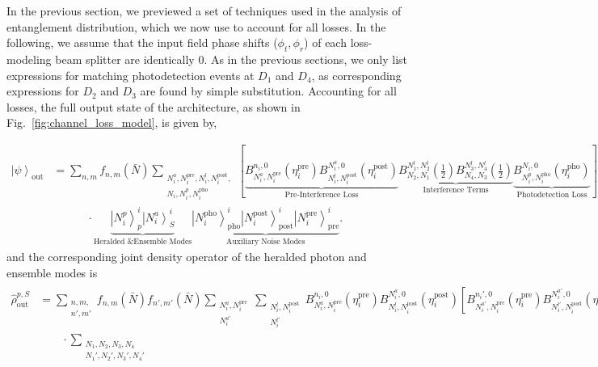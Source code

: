 \documentclass[aps,twocolumn,secnumarabic,amsmath,amssymb,pra,groupedaddress,
showpacs, showkeys,draft]{revtex4-1}
\newcommand{\ket}[1]{\left|#1\right\rangle}
\newcommand{\pna}[1]{\left(#1\right)}
\newcommand{\pnb}[1]{\left[#1\right]}
\begin{document}
In the previous section, we previewed a set of techniques used in the analysis
of entanglement distribution, which we now use to account for all losses. In
the following, we assume that the input field phase shifts ($\phi_t,\phi_r$) of
each loss-modeling beam splitter are identically 0. As in the previous
sections, we only list expressions for matching photodetection events at $D_1$
and $D_4$, as corresponding expressions for $D_2$ and $D_3$ are found by simple
substitution. Accounting for all losses, the full output state of the
architecture, as shown in Fig.~\ref{fig:channel_loss_model}, is given by,
\begin{widetext}
\begin{align}
\ket{\psi}_{\textrm{out}} & = \sum_{n,m} f_{n,m}\pna{\bar{N}}
\sum_{\substack{N_i^a,N_i^{\textrm{pre}},N_i^l,N_i^{\textrm{post}},\\ N_i,N_i^p,N_i^{\textrm{pho}} }}
\pnb{\underbrace{B_{N_i^a,N_i^{\textrm{pre}}}^{n_i,0}\pna{\eta_i^{\textrm{pre}}}  
B_{N_i^l,N_i^{\textrm{post}}}^{N_i^a,0}\pna{\eta_i^{\textrm{post}}}}_\text{Pre-Interference Loss}
\underbrace{B_{N_2,N_1}^{N_1^l,N_2^l}\pna{\frac{1}{2}} B_{N_4,N_3}^{N_3^l,N_4^l}\pna{\frac{1}{2}}}_\text{Interference Terms}
\underbrace{B_{N_i^p,N_i^{\textrm{pho}}}^{N_i,0}\pna{\eta_i^{\textrm{pho}}}}_\text{Photodetection Loss}}   \nonumber \\
& \qquad \quad \cdot \underbrace{\ket{N_i^p}_{p}^i \ket{N_i^a}_{S}^i}_\text{Heralded \& Ensemble Modes} \underbrace{\ket{N_i^{\textrm{pho}}}_{\textrm{pho}}^i \ket{N_i^{\textrm{post}}}_{\textrm{post}}^i \ket{N_i^{\textrm{pre}}}_{\textrm{pre}}^i}_\text{Auxiliary Noise Modes}. 
\end{align}
and the corresponding joint density operator of the heralded photon and
ensemble modes is 
\begin{align}
	\hat{\rho}_{\textrm{out}}^{p,S} & = \sum_{\substack{n,m,\\n',m'}} f_{n,m}\pna{\bar{N}} f_{n',m'}\pna{\bar{N}} \sum_{\substack{N_i^a,N_i^{\textrm{pre}}\\ N_i^{a\prime} }} \sum_{\substack{N_i^l,N_i^{\textrm{post}}\\ N_i^{l\prime} }}
	B_{N_i^a,N_i^{\textrm{pre}}}^{n_i,0}\pna{\eta_i^{\textrm{pre}}} B_{N_i^l,N_i^{\textrm{post}}}^{N_i^a,0}\pna{\eta_i^{\textrm{post}}} \pnb{B_{N_i^{a\prime},N_i^{\textrm{pre}}}^{n_i',0}\pna{\eta_i^{\textrm{pre}}} B_{N_i^{l\prime},N_i^{\textrm{post}}}^{N_i^{a\prime},0}\pna{\eta_i^{\textrm{post}}}}^{*} \nonumber \\
	& \qquad \cdot \sum_{\substack{N_1,N_2,N_3,N_4\\ N_1',N_2',N_3',N_4'}}

\end{align}
\end{widetext}
\end{document}
